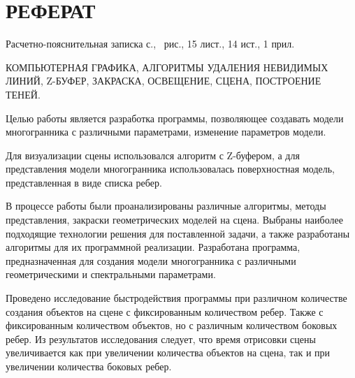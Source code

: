 \section*{\centering РЕФЕРАТ}
\setcounter{page}{2}

Расчетно-пояснительная записка \pageref{LastPage} с., \totalfigures\ рис., 15 лист., 14 ист., 1 прил.

КОМПЬЮТЕРНАЯ ГРАФИКА, АЛГОРИТМЫ УДАЛЕНИЯ НЕВИДИМЫХ ЛИНИЙ, Z-БУФЕР, ЗАКРАСКА, ОСВЕЩЕНИЕ, СЦЕНА, ПОСТРОЕНИЕ ТЕНЕЙ.

Целью работы является разработка программы, позволяющее создавать модели многогранника с различными параметрами, изменение параметров модели.

Для визуализации сцены использовался алгоритм с Z-буфером, а для представления модели многогранника использовалась поверхностная модель, представленная в виде списка ребер.

В процессе работы были проанализированы различные алгоритмы, методы представления, закраски геометрических моделей на сцена. Выбраны наиболее подходящие технологии решения для поставленной задачи, а также разработаны алгоритмы для их программной реализации. Разработана программа, предназначенная для создания модели многогранника с различными геометрическими и спектральными параметрами.

Проведено исследование быстродействия программы при различном количестве создания объектов на сцене с фиксированным количеством ребер. 
Также с фиксированным количеством объектов, но с различным количеством боковых ребер. 
Из результатов исследования следует, что время отрисовки сцены увеличивается как при увеличении количества объектов на сцена, так и при увеличении количества боковых ребер.